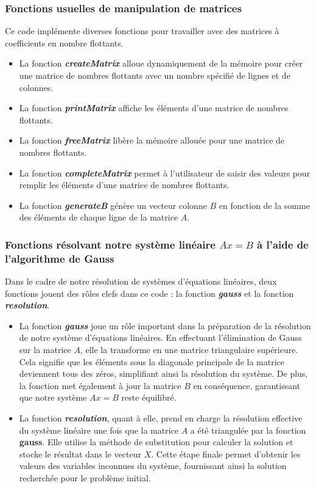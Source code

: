 \subsubsection{Fonctions usuelles de manipulation de matrices}\label{fonctusu}
Ce code implémente diverses fonctions pour travailler avec des matrices à coefficients en nombre flottants.\\
\begin{itemize}
\item La fonction \textit{\textbf{createMatrix}} alloue dynamiquement de la mémoire pour créer une matrice de nombres flottants avec un nombre spécifié de lignes et de colonnes.
\item La fonction \textit{\textbf{printMatrix}} affiche les éléments d'une matrice de nombres flottants.
\item La fonction \textit{\textbf{freeMatrix}} libère la mémoire allouée pour une matrice de nombres flottants.
\item La fonction \textit{\textbf{completeMatrix}} permet à l'utilisateur de saisir des valeurs pour remplir les éléments d'une matrice de nombres flottants.
\item La fonction \textit{\textbf{generateB}} génère un vecteur colonne $B$ en fonction de la somme des éléments de chaque ligne de la matrice $A$.
\end{itemize}

\subsubsection{Fonctions résolvant notre système linéaire $Ax=B$ à l'aide de l'algorithme de Gauss}
Dans le cadre de notre résolution de systèmes d'équations linéaires, deux fonctions jouent des rôles clefs dans ce code : la fonction \textit{\textbf{gauss}} et la fonction \textit{\textbf{resolution}}.\\

\begin{itemize}
\item La fonction \textit{\textbf{gauss}} joue un rôle important dans la préparation de la résolution de notre système d'équations linéaires. En effectuant l'élimination de Gauss sur la matrice $A$, elle la transforme en une matrice triangulaire supérieure. Cela signifie que les éléments sous la diagonale principale de la matrice deviennent tous des zéros, simplifiant ainsi la résolution du système. De plus, la fonction met également à jour la matrice $B$ en conséquence, garantissant que notre système $Ax=B$ reste équilibré.\\

\item La fonction \textit{\textbf{resolution}}, quant à elle, prend en charge la résolution effective du système linéaire une fois que la matrice $A$ a été triangulée par la fonction \textbf{gauss}. Elle utilise la méthode de substitution pour calculer la solution et stocke le résultat dans le vecteur $X$. Cette étape finale permet d'obtenir les valeurs des variables inconnues du système, fournissant ainsi la solution recherchée pour le problème initial.\\
\end{itemize}


